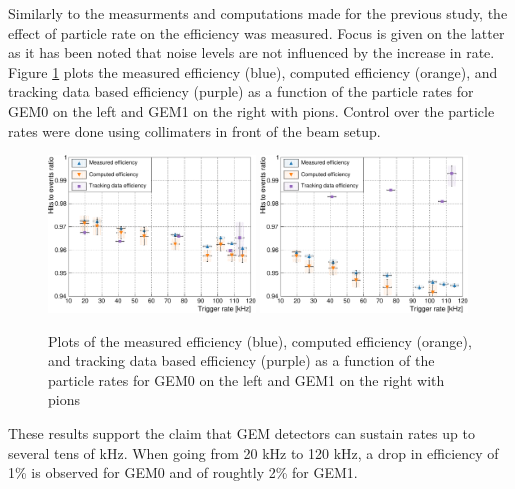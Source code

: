       Similarly to the measurments and computations made for the previous study, the effect of particle rate on the efficiency was measured. Focus is given on the latter as it has been noted that noise levels are not influenced by the increase in rate. Figure \ref{fig:II-3-data-eff-rate} plots the measured efficiency (blue), computed efficiency (orange), and tracking data based efficiency (purple) as a function of the particle rates for GEM0 on the left and GEM1 on the right with pions. Control over the particle rates were done using collimaters in front of the beam setup. \\

      \begin{figure}[h!]
        \centering
        \includegraphics[width=0.49\textwidth]{img/plots/cEfficiency_Rate_GEM0-crop}
        \includegraphics[width=0.49\textwidth]{img/plots/cEfficiency_Rate_GEM1-crop}
        \caption{Plots of the measured efficiency (blue), computed efficiency (orange), and tracking data based efficiency (purple) as a function of the particle rates for GEM0 on the left and GEM1 on the right with pions}
        \label{fig:II-3-data-eff-rate}
      \end{figure}

      These results support the claim that GEM detectors can sustain rates up to several tens of kHz. When going from 20 kHz to 120 kHz, a drop in efficiency of 1\% is observed for GEM0 and of roughtly 2\% for GEM1.


